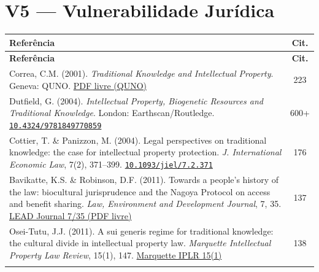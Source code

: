 \documentclass[a4paper,11pt]{article}
\newcommand{\doi}[1]{\href{https://doi.org/#1}{\texttt{#1}}}
\begin{document}
\section{V5 --- Vulnerabilidade Jurídica}

\begin{longtable}{>{\raggedright\arraybackslash}p{} c}
\toprule
\textbf{Referência} & \textbf{Cit.} \\
\midrule
\endfirsthead
\toprule
\textbf{Referência} & \textbf{Cit.} \\
\midrule
\endhead

Correa, C.M. (2001). \textit{Traditional Knowledge and Intellectual Property}. Geneva: QUNO.\newline
\href{https://quakerservice.ca/wp-content/uploads/2011/07/TKcol3.pdf}{PDF livre (QUNO)} & 223 \\
\addlinespace

Dutfield, G. (2004). \textit{Intellectual Property, Biogenetic Resources and Traditional Knowledge}. London: Earthscan/Routledge.\newline
\doi{10.4324/9781849770859} & 600+ \\
\addlinespace

Cottier, T. \& Panizzon, M. (2004). Legal perspectives on traditional knowledge: the case for intellectual property protection. \textit{J. International Economic Law}, 7(2), 371--399.\newline
\doi{10.1093/jiel/7.2.371} & 176 \\
\addlinespace

Bavikatte, K.S. \& Robinson, D.F. (2011). Towards a people's history of the law: biocultural jurisprudence and the Nagoya Protocol on access and benefit sharing. \textit{Law, Environment and Development Journal}, 7, 35.\newline
\href{http://www.lead-journal.org/content/11035.pdf}{LEAD Journal 7/35 (PDF livre)} & 137 \\
\addlinespace

Osei-Tutu, J.J. (2011). A sui generis regime for traditional knowledge: the cultural divide in intellectual property law. \textit{Marquette Intellectual Property Law Review}, 15(1), 147.\newline
\href{https://scholarship.law.marquette.edu/iplr/vol15/iss1/6/}{Marquette IPLR 15(1)} & 138 \\
\addlinespace


\end{longtable}
\end{document}
